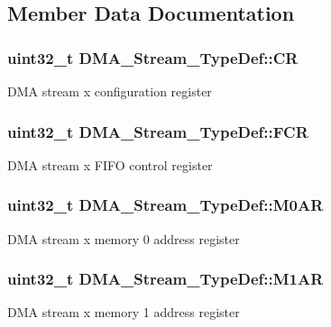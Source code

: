 \subsection{Member Data Documentation}
\subsubsection[{\texorpdfstring{CR}{CR}}]{ uint32\+\_\+t D\+M\+A\+\_\+\+Stream\+\_\+\+Type\+Def\+::\+CR}\hypertarget{struct_d_m_a___stream___type_def_af893adc5e821b15d813237b2bfe4378b}{}\label{struct_d_m_a___stream___type_def_af893adc5e821b15d813237b2bfe4378b}
D\+MA stream x configuration register 
\subsubsection[{\texorpdfstring{F\+CR}{FCR}}]{ uint32\+\_\+t D\+M\+A\+\_\+\+Stream\+\_\+\+Type\+Def\+::\+F\+CR}\hypertarget{struct_d_m_a___stream___type_def_aad3d78ab35e7af48951be5be53392f9f}{}\label{struct_d_m_a___stream___type_def_aad3d78ab35e7af48951be5be53392f9f}
D\+MA stream x F\+I\+FO control register 
\subsubsection[{\texorpdfstring{M0\+AR}{M0AR}}]{ uint32\+\_\+t D\+M\+A\+\_\+\+Stream\+\_\+\+Type\+Def\+::\+M0\+AR}\hypertarget{struct_d_m_a___stream___type_def_a965da718db7d0303bff185d367d96fd6}{}\label{struct_d_m_a___stream___type_def_a965da718db7d0303bff185d367d96fd6}
D\+MA stream x memory 0 address register 
\subsubsection[{\texorpdfstring{M1\+AR}{M1AR}}]{ uint32\+\_\+t D\+M\+A\+\_\+\+Stream\+\_\+\+Type\+Def\+::\+M1\+AR}\hypertarget{struct_d_m_a___stream___type_def_a142ca5a1145ba9cf4cfa557655af1c13}{}\label{struct_d_m_a___stream___type_def_a142ca5a1145ba9cf4cfa557655af1c13}
D\+MA stream x memory 1 address register 
